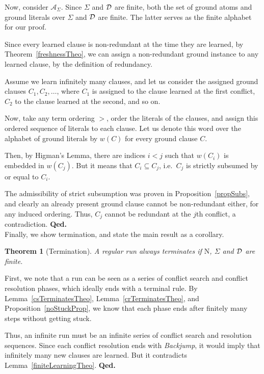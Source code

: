 \documentclass[a4paper]{article}
\newcommand{\startproof}{{\bf Proof:~}}
\newcommand{\finishproof}{{\bf Qed.}}
\newcommand{\leaveabit}{\\[6 pt]}
\newtheorem{theo}[defi]{Theorem}
\begin{document}
Now, consider $\mathcal{A}_{\Sigma}$. Since $\Sigma$ and $\mathcal{D}$ are finite, both the set of ground atoms and ground literals over $\Sigma$ and $\mathcal{D}$ are finite.
The latter serves as the finite alphabet for our proof.

Since every learned clause is non-redundant at the time they are learned, by Theorem~\ref{freshnessTheo}, 
we can assign a non-redundant ground instance to any learned clause, by the definition of redundancy.

Assume we learn infinitely many clauses, and let us consider the assigned ground clauses $C_1, C_2, \dots$, where
$C_1$ is assigned to the clause learned at the first conflict, $C_2$ to the clause learned at the second, and so on.

Now, take any term ordering $>$, order the literals of the clauses, and assign this ordered sequence of literals to each clause. 
Let us denote this word over the alphabet of ground literals by $w(C)$ for every ground clause $C$.

Then, by Higman's Lemma, there are indices $i < j$ such that $w(C_i)$ is embedded in $w(C_j)$.
But it means that $C_i \subseteq C_j$, i.e.\ $C_j$ is strictly subsumed by or equal to $C_i$.

The admissibility of strict subsumption was proven in Proposition~\ref{propSubs}, and clearly 
an already present ground clause cannot be non-redundant either, for any induced ordering.
Thus, $C_j$ cannot be redundant at the $j$th conflict, a contradiction.
\finishproof\leaveabit
\noindent
Finally, we show termination, and state the main result as a corollary.
\begin{theo}[Termination]\label{termRunTheo}
A regular run always terminates if $\text{N}$, $\Sigma$ and $\mathcal{D}$ are finite.
\end{theo}
\noindent\startproof 
First, we note that a run can be seen as a series of conflict search and conflict resolution phases, which ideally ends with a terminal rule.
By Lemma~\ref{csTerminatesTheo}, Lemma~\ref{crTerminatesTheo}, and Proposition~\ref{noStuckProp}, 
we know that each phase ends after finitely many steps without getting stuck. 

Thus, an infinite run must be an infinite series of conflict search and resolution sequences. Since each conflict resolution ends with 
\emph{Backjump}, it would imply that infinitely many new clauses are learned. But it contradicts Lemma~\ref{finiteLearningTheo}. 
\finishproof
\end{document}
